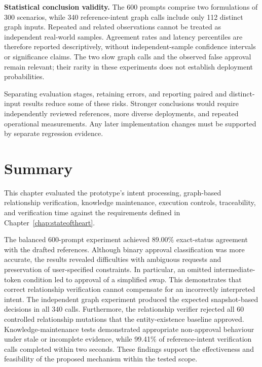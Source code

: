 \medskip\noindent\textbf{Statistical conclusion validity.}
The 600 prompts comprise two formulations of 300 scenarios, while 340
reference-intent graph calls include only 112 distinct graph inputs. Repeated
and related observations cannot be treated as independent real-world samples.
Agreement rates and latency percentiles are therefore reported descriptively,
without independent-sample confidence intervals or significance claims.
The two slow graph calls and the observed false approval remain relevant;
their rarity in these experiments does not establish deployment probabilities.

Separating evaluation stages, retaining errors, and reporting paired and
distinct-input results reduce some of these risks. Stronger conclusions would
require independently reviewed references, more diverse deployments, and
repeated operational measurements. Any later implementation changes must be
supported by separate regression evidence.


\section{Summary}
\label{sec:evaluation_summary}

This chapter evaluated the prototype's intent processing, graph-based
relationship verification, knowledge maintenance, execution controls,
traceability, and verification time against the requirements defined in
Chapter~\ref{chap:stateoftheart}.

The balanced 600-prompt experiment achieved 89.00\% exact-status agreement
with the drafted references. Although binary approval classification was
more accurate, the results revealed difficulties with ambiguous requests
and preservation of user-specified constraints. In particular, an omitted
intermediate-token condition led to approval of a simplified swap. This
demonstrates that correct relationship verification cannot compensate for
an incorrectly interpreted intent. The independent graph experiment produced the expected snapshot-based
decisions in all 340 calls. Furthermore, the relationship verifier rejected
all 60 controlled relationship mutations that the entity-existence baseline
approved. Knowledge-maintenance tests demonstrated appropriate non-approval
behaviour under stale or incomplete evidence, while 99.41\% of reference-intent
verification calls completed within two seconds. These findings support the
effectiveness and feasibility of the proposed mechanism within the tested
scope. 

